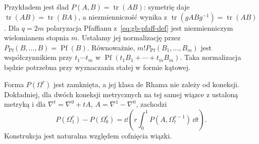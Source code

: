 Przykładem jest ślad $P(A,B)=\operatorname{tr}(AB)$:
symetrię daje $\operatorname{tr}(AB)=\operatorname{tr}(BA)$,
a niezmienniczość wynika z
$\operatorname{tr}(gABg^{-1})=\operatorname{tr}(AB)$.
Dla $q=2m$ polaryzacja Pfaffianu
z~\eqref{eq:gb-pfaff-def} jest
niezmienniczym wielomianem stopnia $m$.
Ustalamy jej normalizację przez
$P_{\operatorname{Pf}}(B,\ldots,B)=\operatorname{Pf}(B)$.
Równoważnie, $m!P_{\operatorname{Pf}}(B_1,\ldots,B_m)$
jest współczynnikiem przy $t_1\cdots t_m$ w
$\operatorname{Pf}(t_1B_1+\cdots+t_mB_m)$.
Taka normalizacja będzie potrzebna przy wyznaczaniu
stałej w formie kątowej.

\begin{twierdzenie}
\label{thm:chern-weil-26}
Forma $P(\Omega^r)$ jest zamknięta,
a jej klasa de Rhama nie zależy od koneksji.
Dokładniej, dla dwóch koneksji metrycznych na tej samej wiązce
z ustaloną metryką i dla $\nabla^t=\nabla^0+tA$,
$A=\nabla^1-\nabla^0$, zachodzi
\begin{equation}\label{eq:CW-transgression-26}
 P(\Omega_1^r)-P(\Omega_0^r)
 =\dd\left(r\int_0^1
       P(A,\Omega_t^{r-1})\,\dd t\right).
\end{equation}
Konstrukcja jest naturalna względem cofnięcia wiązki.
\end{twierdzenie}
